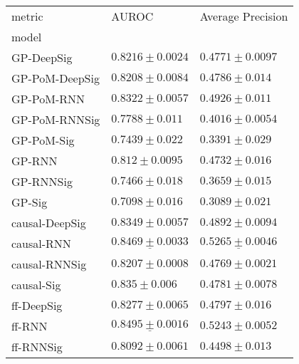 \begin{tabular}{lll}
\toprule
metric &                                           AUROC &                               Average Precision \\
model          &                                                 &                                                 \\
\midrule
GP-DeepSig     &                           $ 0.8216 \pm 0.0024 $ &                           $ 0.4771 \pm 0.0097 $ \\
GP-PoM-DeepSig &                           $ 0.8208 \pm 0.0084 $ &                            $ 0.4786 \pm 0.014 $ \\
GP-PoM-RNN     &                           $ 0.8322 \pm 0.0057 $ &                            $ 0.4926 \pm 0.011 $ \\
GP-PoM-RNNSig  &                            $ 0.7788 \pm 0.011 $ &                           $ 0.4016 \pm 0.0054 $ \\
GP-PoM-Sig     &                            $ 0.7439 \pm 0.022 $ &                            $ 0.3391 \pm 0.029 $ \\
GP-RNN         &                            $ 0.812 \pm 0.0095 $ &                            $ 0.4732 \pm 0.016 $ \\
GP-RNNSig      &                            $ 0.7466 \pm 0.018 $ &                            $ 0.3659 \pm 0.015 $ \\
GP-Sig         &                            $ 0.7098 \pm 0.016 $ &                            $ 0.3089 \pm 0.021 $ \\
causal-DeepSig &                           $ 0.8349 \pm 0.0057 $ &                           $ 0.4892 \pm 0.0094 $ \\
causal-RNN     &            $  \underline{ 0.8469 \pm 0.0033 } $ &  $  \mathbf{ \underline{ 0.5265 \pm 0.0046 }} $ \\
causal-RNNSig  &                           $ 0.8207 \pm 0.0008 $ &                           $ 0.4769 \pm 0.0021 $ \\
causal-Sig     &                             $ 0.835 \pm 0.006 $ &                           $ 0.4781 \pm 0.0078 $ \\
ff-DeepSig     &                           $ 0.8277 \pm 0.0065 $ &                            $ 0.4797 \pm 0.016 $ \\
ff-RNN         &  $  \mathbf{ \underline{ 0.8495 \pm 0.0016 }} $ &               $  \mathbf{ 0.5243 \pm 0.0052 } $ \\
ff-RNNSig      &                           $ 0.8092 \pm 0.0061 $ &                            $ 0.4498 \pm 0.013 $ \\

\end{tabular}
